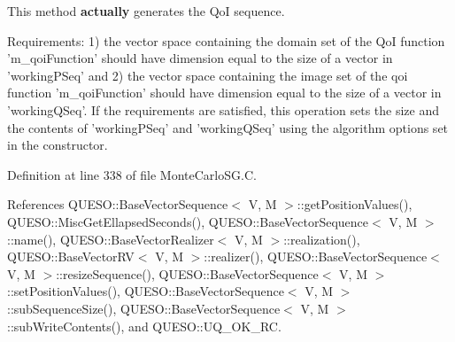 This method {\bfseries actually} generates the Qo\-I sequence. 

Requirements\-: 1) the vector space containing the domain set of the Qo\-I function 'm\-\_\-qoi\-Function' should have dimension equal to the size of a vector in 'working\-P\-Seq' and 2) the vector space containing the image set of the qoi function 'm\-\_\-qoi\-Function' should have dimension equal to the size of a vector in 'working\-Q\-Seq'. If the requirements are satisfied, this operation sets the size and the contents of 'working\-P\-Seq' and 'working\-Q\-Seq' using the algorithm options set in the constructor. 

Definition at line 338 of file Monte\-Carlo\-S\-G.\-C.



References Q\-U\-E\-S\-O\-::\-Base\-Vector\-Sequence$<$ V, M $>$\-::get\-Position\-Values(), Q\-U\-E\-S\-O\-::\-Misc\-Get\-Ellapsed\-Seconds(), Q\-U\-E\-S\-O\-::\-Base\-Vector\-Sequence$<$ V, M $>$\-::name(), Q\-U\-E\-S\-O\-::\-Base\-Vector\-Realizer$<$ V, M $>$\-::realization(), Q\-U\-E\-S\-O\-::\-Base\-Vector\-R\-V$<$ V, M $>$\-::realizer(), Q\-U\-E\-S\-O\-::\-Base\-Vector\-Sequence$<$ V, M $>$\-::resize\-Sequence(), Q\-U\-E\-S\-O\-::\-Base\-Vector\-Sequence$<$ V, M $>$\-::set\-Position\-Values(), Q\-U\-E\-S\-O\-::\-Base\-Vector\-Sequence$<$ V, M $>$\-::sub\-Sequence\-Size(), Q\-U\-E\-S\-O\-::\-Base\-Vector\-Sequence$<$ V, M $>$\-::sub\-Write\-Contents(), and Q\-U\-E\-S\-O\-::\-U\-Q\-\_\-\-O\-K\-\_\-\-R\-C.


